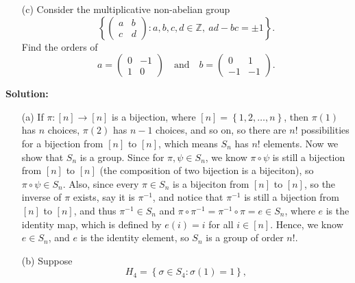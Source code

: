 \documentclass[12pt]{article}
\begin{document}
\begin{enumerate}
\begin{enumerate}
        \item[(c)] Consider the multiplicative non-abelian group
        \[
        \left\{
        \begin{pmatrix}
        a & b \\
        c & d
        \end{pmatrix}
        : a, b, c, d \in \mathbb{Z}, \ ad - bc = \pm 1
        \right\}.
        \]
        Find the orders of
        \[
        a = \begin{pmatrix}
        0 & -1 \\
        1 & 0
        \end{pmatrix}
        \quad \text{and} \quad
        b = \begin{pmatrix}
        0 & 1 \\
        -1 & -1
        \end{pmatrix}.
        \]
    \end{enumerate}
    \textbf{Solution:}
    \begin{itemize}
        \item [(a)] If \(\pi : [n] \to [n]\) is a bijection, where \([n] = \left\{ 1,2, \dots ,n \right\} \), then \(\pi (1)\) has \(n\) choices, \(\pi (2)\) has \(n-1\) choices, and so on, so there are \(n!\) possibilities for a bijection from \([n]\) to \([n]\), which means \(S_n\) has \(n!\) elements. Now we show that \(S_n\) is a group. Since for \(\pi , \psi \in S_n\), we know \(\pi \circ \psi \) is still a bijection from \([n]\) to \([n]\) (the composition of two bijection is a bijeciton), so \(\pi \circ \psi \in S_n\). Also, since every \(\pi  \in S_n \) is a bijeciton from \([n]\) to \([n]\), so the inverse of \(\pi \) exists, say it is \(\pi ^{-1}\), and notice that \(\pi ^{-1}\) is still a bijection from \([n]\) to \([n]\), and thus \(\pi ^{-1} \in S_n\) and \(\pi \circ \pi ^{-1} = \pi ^{-1} \circ \pi = e \in S_n\), where \(e\) is the identity map, which is defined by \(e(i) = i\) for all \(i \in [n]\). Hence, we know \(e \in S_n\), and \(e\) is the identity element, so \(S_n\) is a group of order \(n!\).
        \item [(b)] Suppose 
        \[
            H_4 = \left\{ \sigma \in S_4 : \sigma (1) = 1 \right\}, 
        \]

\end{itemize}
\end{enumerate}
\end{document}
